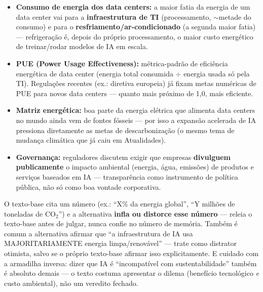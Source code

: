 \begin{conceito}
\begin{itemize}
\item \textbf{Consumo de energia dos data centers:} a maior fatia da energia
de um data center vai para a \textbf{infraestrutura de TI} (processamento,
${\sim}$metade do consumo) e para o \textbf{resfriamento/ar-condicionado}
(a segunda maior fatia) --- refrigeração é, depois do próprio processamento,
o maior custo energético de treinar/rodar modelos de IA em escala.
\item \textbf{PUE (Power Usage Effectiveness):} métrica-padrão de eficiência
energética de data center (energia total consumida $\div$ energia usada só
pela TI). Regulações recentes (ex.: diretiva europeia) já fixam metas
numéricas de PUE para novos data centers --- quanto mais próximo de 1,0,
mais eficiente.
\item \textbf{Matriz energética:} boa parte da energia elétrica que alimenta
data centers no mundo ainda vem de fontes fósseis --- por isso a expansão
acelerada de IA pressiona diretamente as metas de descarbonização (o mesmo
tema de mudança climática que já caiu em Atualidades).
\item \textbf{Governança:} reguladores discutem exigir que empresas
\textbf{divulguem publicamente} o impacto ambiental (energia, água,
emissões) de produtos e serviços baseados em IA --- transparência como
instrumento de política pública, não só como boa vontade corporativa.
\end{itemize}
\end{conceito}

\begin{pegadinha}
O texto-base cita um número (ex.: ``X\% da energia global'', ``Y milhões de
toneladas de CO$_2$'') e a alternativa \textbf{infla ou distorce esse
número} --- releia o texto-base antes de julgar, nunca confie no número de
memória. Também é comum a alternativa afirmar que ``a infraestrutura de IA
usa MAJORITARIAMENTE energia limpa/renovável'' --- trate como distrator
otimista, salvo se o próprio texto-base afirmar isso explicitamente. E cuidado
com a armadilha inversa: dizer que IA é ``incompatível com sustentabilidade''
também é absoluto demais --- o texto costuma apresentar o dilema (benefício
tecnológico \emph{e} custo ambiental), não um veredito fechado.
\end{pegadinha}

